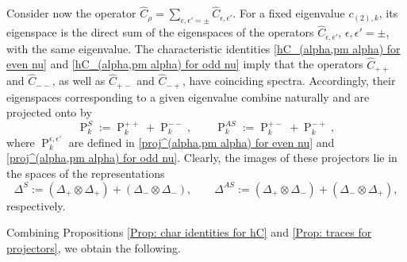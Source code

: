 \documentclass[a4paper]{article}
\newcommand{\hC}{\widehat{C}}
\renewcommand{\=}{\ =\ }
\DeclareMathOperator{\proj}{P}
\numberwithin{equation}{section}
\theoremstyle{remark}
\begin{document}
Consider now the operator $\hC_\rho=\sum_{\epsilon,\epsilon'=\pm}\hC_{\epsilon,\epsilon'}$. For a fixed eigenvalue $c_{(2),k}$, its eigenspace is the direct sum of the eigenspaces of the operators $\hC_{\epsilon,\epsilon'}$, $\epsilon,\epsilon'=\pm$, with the same eigenvalue. The characteristic identities
\eqref{hC_(alpha,pm alpha) for even nu} and
\eqref{hC_(alpha,pm alpha) for odd nu} imply that the operators $\hC_{++}$ and $\hC_{--}$, as well as $\hC_{+-}$ and $\hC_{-+}$, have coinciding spectra. Accordingly, their eigenspaces corresponding to a given eigenvalue combine naturally and are projected onto by
\begin{equation}\label{proj_k^S and proj_k^AS}
\proj_k^{S}:=\proj_k^{++}+\proj_k^{--},\qquad
\proj_k^{AS}:=\proj_k^{+-}+\proj_k^{-+},
\end{equation}
where $\proj_k^{\epsilon,\epsilon'}$ are defined in
\eqref{proj^(alpha,pm alpha) for even nu} and
\eqref{proj^(alpha,pm alpha) for odd nu}.
Clearly, the images of these projectors lie in the spaces of the representations
\begin{equation}\label{Delta^S and Delta^AS def}
\Delta^{S}:=(\Delta_+\otimes \Delta_+)+(\Delta_-\otimes \Delta_-),
\qquad
\Delta^{AS}:=(\Delta_+\otimes \Delta_-)+(\Delta_-\otimes \Delta_+),
\end{equation}
respectively.

Combining Propositions \ref{Prop: char identities for hC} and
\ref{Prop: traces for projectors}, we obtain the following.
\end{document}
